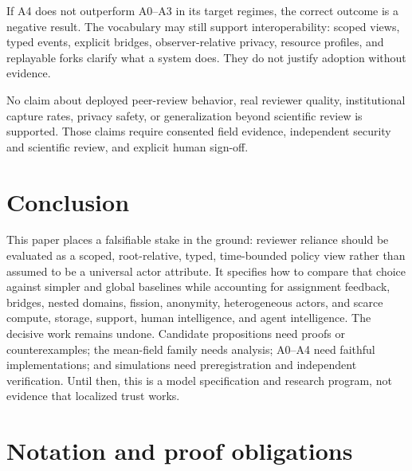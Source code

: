 \documentclass[11pt]{article}
\begin{document}
If A4 does not outperform A0--A3 in its target regimes, the correct outcome is a negative result.  The vocabulary may still support interoperability: scoped views, typed events, explicit bridges, observer-relative privacy, resource profiles, and replayable forks clarify what a system does.  They do not justify adoption without evidence.

\begin{evidencegate}
No claim about deployed peer-review behavior, real reviewer quality, institutional capture rates, privacy safety, or generalization beyond scientific review is supported.  Those claims require consented field evidence, independent security and scientific review, and explicit human sign-off.
\end{evidencegate}

\section{Conclusion}

This paper places a falsifiable stake in the ground: reviewer reliance should be evaluated as a scoped, root-relative, typed, time-bounded policy view rather than assumed to be a universal actor attribute.  It specifies how to compare that choice against simpler and global baselines while accounting for assignment feedback, bridges, nested domains, fission, anonymity, heterogeneous actors, and scarce compute, storage, support, human intelligence, and agent intelligence.  The decisive work remains undone.  Candidate propositions need proofs or counterexamples; the mean-field family needs analysis; A0--A4 need faithful implementations; and simulations need preregistration and independent verification.  Until then, this is a model specification and research program, not evidence that localized trust works.

\appendix
\section{Notation and proof obligations}
\end{document}
